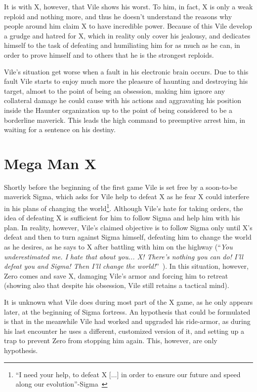 It is with X, however, that Vile shows his worst. To him, in fact, X is only a weak reploid and nothing more, and thus he doesn't understand the reasons why people around him claim X to have incredible power. Because of this Vile develop a grudge and hatred for X, which in reality only cover his jealousy, and dedicates himself to the task of defeating and humiliating him for as much as he can, in order to prove himself and to others that he is the strongest reploids.

Vile's situation get worse when a fault in his electronic brain occurs. Due to this fault Vile starts to enjoy much more the pleasure of haunting and destroying his target, almost to the point of being an obsession, making him ignore any collateral damage he could cause with his actions and aggravating his position inside the Haunter organization up to the point of being considered to be a borderline maverick. This leads the high command  to preemptive arrest him, in waiting for a sentence on his destiny.

\section{Mega Man X}
Shortly before the beginning of the first game Vile is set free by a soon-to-be maverick Sigma, which asks for Vile help to defeat X as he fear X could interfere in his plans of changing the world\footnote{``I need your help, to defeat X [$\dots$] in order to ensure our future and speed along our evolution''-Sigma~\cite{MHX:Vile_script}}. Although Vile's hate for taking orders, the idea of defeating X is sufficient for him to follow Sigma and help him with his plan. In reality, however, Vile's claimed objective is to follow Sigma only until X's defeat and then to turn against Sigma himself, defeating him to change the world as he desires, as he says to X after battling with him on the highway (``\textit{You underestimated me. I hate that about you... X! There's nothing you can do! I'll defeat you and Sigma! Then I'll change the world!}''~\cite{wiki:MM_MHX_script}). In this situation, however, Zero comes and save X, damaging Vile's armor and forcing him to retreat (showing also that despite his obsession, Vile still retains a tactical mind). 

It is unknown what Vile does during most part of the X game, as he only appears later, at the beginning of Sigma fortress. An hypothesis that could be  formulated is that in the meanwhile Vile had worked and upgraded his ride-armor, as during his last encounter he uses a different, customized version of it, and setting up a trap to prevent Zero from stopping him again. This, however, are only hypothesis.

